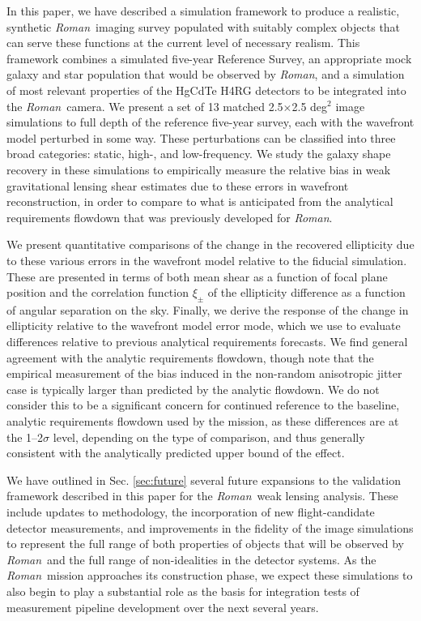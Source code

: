 \documentclass[usenatbib]{mnras}
\newcommand{\wfirst}{{\slshape Roman}}
\begin{document}
In this paper, we have described a simulation framework to produce a realistic, synthetic \wfirst\ imaging survey populated with suitably complex objects that can serve these functions at the current level of necessary realism. 
This framework combines a simulated five-year Reference Survey, an appropriate mock galaxy and star population that would be observed by \wfirst, and a simulation of most relevant properties of the HgCdTe H4RG detectors to be integrated into the \wfirst\ camera. 
We present a set of 13 matched 2.5$\times$2.5 deg$^2$ image simulations to full depth of the reference five-year survey, each with the wavefront model perturbed in some way. These perturbations can be classified into three broad categories: static, high-, and low-frequency.
We study the galaxy shape recovery in these simulations to empirically measure the relative bias in weak gravitational lensing shear estimates due to these errors in wavefront reconstruction, in order to compare to what is anticipated from the analytical requirements flowdown that was previously developed for \wfirst.  

We present quantitative comparisons of the change in the recovered ellipticity due to these various errors in the wavefront model relative to the fiducial simulation. 
These are presented in terms of both mean shear as a function of focal plane position and the correlation function $\xi_{\pm}$ of the ellipticity difference as a function of angular separation on the sky. 
Finally, we derive the response of the change in ellipticity relative to the wavefront model error mode, which we use to evaluate differences relative to previous analytical requirements forecasts.
We find general agreement with the analytic requirements flowdown, though note that the empirical measurement of the bias induced in the non-random anisotropic jitter case is typically larger than predicted by the analytic flowdown. 
We do not consider this to be a significant concern for continued reference to the baseline, analytic requirements flowdown used by the mission, as these differences are at the 1--2$\sigma$ level, depending on the type of comparison, and thus generally consistent with the analytically predicted upper bound of the effect. 

We have outlined in Sec. \ref{sec:future} several future expansions to the validation framework described in this paper for the \wfirst\ weak lensing analysis. 
These include updates to methodology, the incorporation of new flight-candidate detector measurements, and improvements in the fidelity of the image simulations to represent the full range of both properties of objects that will be observed by \wfirst\ and the full range of non-idealities in the detector systems. 
As the \wfirst\ mission approaches its construction phase, we expect these simulations to also begin to play a substantial role as the basis for integration tests of measurement pipeline development over the next several years. 
\end{document}
